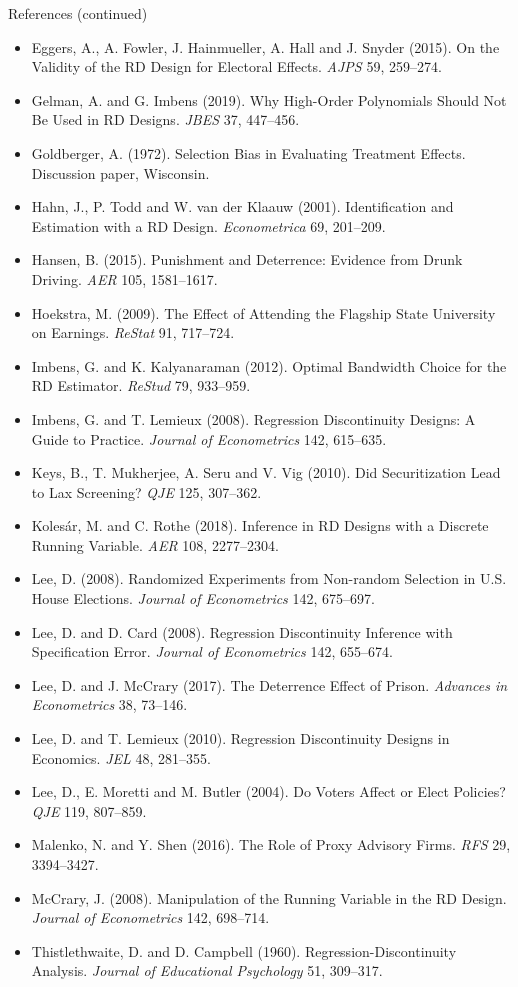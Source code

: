 \documentclass[
  11pt,
  ignorenonframetext,
  aspectratio=169,
]{beamer}
\providecommand{\tightlist}{%
  \setlength{\itemsep}{0pt}\setlength{\parskip}{0pt}}
\begin{document}
\begin{frame}{References (continued)}
\protect{}\label{references-continued}
\tiny

\begin{itemize}
\tightlist
\item
  Eggers, A., A. Fowler, J. Hainmueller, A. Hall and J. Snyder (2015).
  On the Validity of the RD Design for Electoral Effects. \emph{AJPS}
  59, 259--274.
\item
  Gelman, A. and G. Imbens (2019). Why High-Order Polynomials Should Not
  Be Used in RD Designs. \emph{JBES} 37, 447--456.
\item
  Goldberger, A. (1972). Selection Bias in Evaluating Treatment Effects.
  Discussion paper, Wisconsin.
\item
  Hahn, J., P. Todd and W. van der Klaauw (2001). Identification and
  Estimation with a RD Design. \emph{Econometrica} 69, 201--209.
\item
  Hansen, B. (2015). Punishment and Deterrence: Evidence from Drunk
  Driving. \emph{AER} 105, 1581--1617.
\item
  Hoekstra, M. (2009). The Effect of Attending the Flagship State
  University on Earnings. \emph{ReStat} 91, 717--724.
\item
  Imbens, G. and K. Kalyanaraman (2012). Optimal Bandwidth Choice for
  the RD Estimator. \emph{ReStud} 79, 933--959.
\item
  Imbens, G. and T. Lemieux (2008). Regression Discontinuity Designs: A
  Guide to Practice. \emph{Journal of Econometrics} 142, 615--635.
\item
  Keys, B., T. Mukherjee, A. Seru and V. Vig (2010). Did Securitization
  Lead to Lax Screening? \emph{QJE} 125, 307--362.
\item
  Kolesár, M. and C. Rothe (2018). Inference in RD Designs with a
  Discrete Running Variable. \emph{AER} 108, 2277--2304.
\item
  Lee, D. (2008). Randomized Experiments from Non-random Selection in
  U.S. House Elections. \emph{Journal of Econometrics} 142, 675--697.
\item
  Lee, D. and D. Card (2008). Regression Discontinuity Inference with
  Specification Error. \emph{Journal of Econometrics} 142, 655--674.
\item
  Lee, D. and J. McCrary (2017). The Deterrence Effect of Prison.
  \emph{Advances in Econometrics} 38, 73--146.
\item
  Lee, D. and T. Lemieux (2010). Regression Discontinuity Designs in
  Economics. \emph{JEL} 48, 281--355.
\item
  Lee, D., E. Moretti and M. Butler (2004). Do Voters Affect or Elect
  Policies? \emph{QJE} 119, 807--859.
\item
  Malenko, N. and Y. Shen (2016). The Role of Proxy Advisory Firms.
  \emph{RFS} 29, 3394--3427.
\item
  McCrary, J. (2008). Manipulation of the Running Variable in the RD
  Design. \emph{Journal of Econometrics} 142, 698--714.
\item
  Thistlethwaite, D. and D. Campbell (1960). Regression-Discontinuity
  Analysis. \emph{Journal of Educational Psychology} 51, 309--317.
\end{itemize}
\end{frame}
\end{document}
